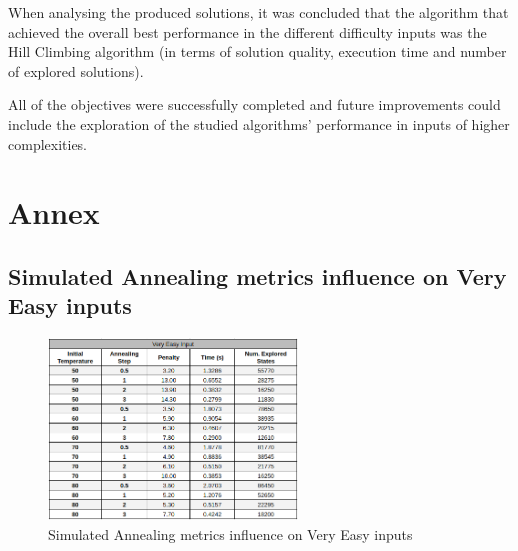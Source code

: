 \documentclass[conference]{IEEEtran}
\begin{document}
When analysing the produced solutions, it was concluded that the algorithm that achieved the overall best performance in the different difficulty inputs was the Hill Climbing algorithm (in terms of solution quality, execution time and number of explored solutions). 

All  of  the  objectives  were  successfully  completed  and future improvements could include the exploration of the studied algorithms' performance in inputs of higher complexities.

\begin{thebibliography}{00}
    



\end{thebibliography}

\section{Annex} \label{sec:annex}

\subsection{Simulated Annealing metrics influence on Very Easy inputs}

\begin{figure}[H]
    \centerline{\includegraphics[width=250px]{annealing_very_easy.png}}
    \caption{Simulated Annealing metrics influence on Very Easy inputs}
\end{figure}
\end{document}
